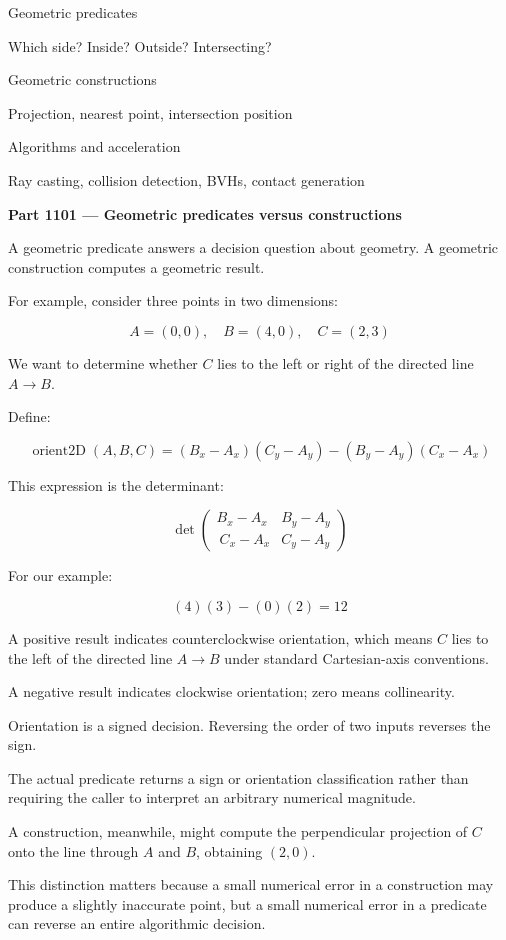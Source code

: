 Geometric predicates

Which side? Inside? Outside? Intersecting?

Geometric constructions

Projection, nearest point, intersection position

Algorithms and acceleration

Ray casting, collision detection, BVHs, contact generation

\textbf{Part 1101 --- Geometric predicates versus constructions}

A geometric predicate answers a decision question about geometry. A geometric construction computes a geometric result.

For example, consider three points in two dimensions:

\[
A=(0,0),\quad B=(4,0),\quad C=(2,3)
\]

We want to determine whether \(C\) lies to the left or right of the directed line \(A\rightarrow B\).

Define:

\[
\operatorname{orient2D}(A,B,C)= (B_x-A_x)(C_y-A_y) - (B_y-A_y)(C_x-A_x)
\]

This expression is the determinant:

\[
\det \begin{pmatrix} B_x-A_x & B_y-A_y\\\ C_x-A_x & C_y-A_y \end{pmatrix}
\]

For our example:

\[
(4)(3)-(0)(2)=12
\]

A positive result indicates counterclockwise orientation, which means \(C\) lies to the left of the directed line \(A\rightarrow B\) under standard Cartesian-axis conventions.

A negative result indicates clockwise orientation; zero means collinearity.

Orientation is a signed decision. Reversing the order of two inputs reverses the sign.

The actual predicate returns a sign or orientation classification rather than requiring the caller to interpret an arbitrary numerical magnitude.

A construction, meanwhile, might compute the perpendicular projection of \(C\) onto the line through \(A\) and \(B\), obtaining \((2,0)\).

This distinction matters because a small numerical error in a construction may produce a slightly inaccurate point, but a small numerical error in a predicate can reverse an entire algorithmic decision.

